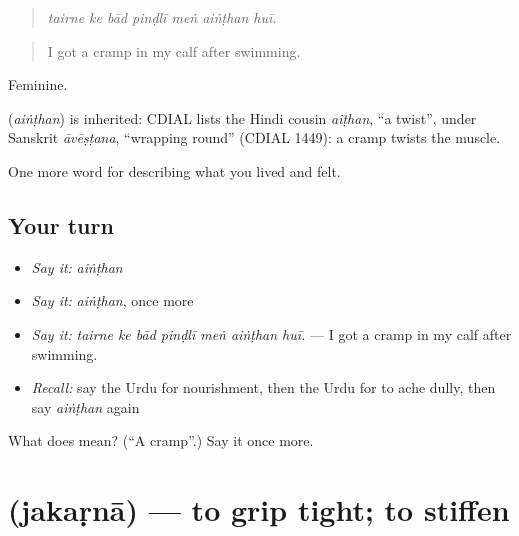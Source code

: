 \begin{quote}
      
\end{quote}

\begin{quote}
\emph{tairne ke bād pinḍlī meṅ aiṅṭhan huī.}
\end{quote}

\begin{quote}
I got a cramp in my calf after swimming.
\end{quote}

Feminine.

\begin{cousinweb}
\textbf{} (\emph{aiṅṭhan}) is inherited: CDIAL lists the Hindi cousin \emph{aĩṭhan}, \textquotedblleft{}a twist\textquotedblright{}, under Sanskrit \emph{āvēṣṭana}, \textquotedblleft{}wrapping round\textquotedblright{} (CDIAL 1449): a cramp twists the muscle.
\end{cousinweb}

\begin{grammarlens}[title={What you've built}]
One more word for describing what you lived and felt.
\end{grammarlens}

\subsection*{Your turn}
\begin{itemize}
\raggedright
  \item \emph{Say it:} \emph{aiṅṭhan}
  \item \emph{Say it:} \emph{aiṅṭhan}, once more
  \item \emph{Say it:} \emph{tairne ke bād pinḍlī meṅ aiṅṭhan huī.} — I got a cramp in my calf after swimming.
  \item \emph{Recall:} say the Urdu for nourishment, then the Urdu for to ache dully, then say \emph{aiṅṭhan} again
\end{itemize}

\begin{tcolorbox}[breakable,colback=teal!4,colframe=teal!35!black,title={Before you move on}]
What does  mean? (\textquotedblleft{}A cramp\textquotedblright{}.) Say it once more.
\end{tcolorbox}
\section[\texorpdfstring{\ur{جکڑنا} (jakaṛnā)}{جکڑنا (jakaṛnā)}]{ (jakaṛnā) — to grip tight; to stiffen}

